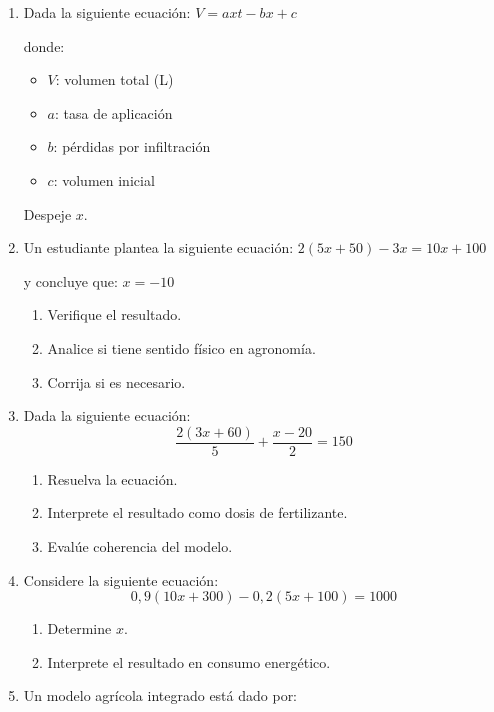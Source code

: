 \documentclass[11pt]{article}
\begin{document}
\begin{enumerate}
		\item Dada la siguiente ecuación:	$V = axt - bx + c$
		
		donde:
		\begin{itemize}
			\item $V$: volumen total (L)
			\item $a$: tasa de aplicación
			\item $b$: pérdidas por infiltración
			\item $c$: volumen inicial
		\end{itemize}
		
		
		Despeje $x$.
		
		
		\newpage
		\vspace*{0.2em}
		
		\item Un estudiante plantea la siguiente ecuación: $
		2(5x + 50) - 3x = 10x + 100$
		
		
		y concluye que: $x = -10$
				
		\begin{enumerate}
			\item Verifique el resultado.
			\item Analice si tiene sentido físico en agronomía.
			\item Corrija si es necesario.
		\end{enumerate}
		
		\item Dada la siguiente ecuación:
		\[
		\frac{2(3x + 60)}{5} + \frac{x - 20}{2} = 150
		\]
		
		\begin{enumerate}
			\item Resuelva la ecuación.
			\item Interprete el resultado como dosis de fertilizante.
			\item Evalúe coherencia del modelo.
		\end{enumerate}
		
		\item Considere la siguiente ecuación:
			\[
		0{,}9(10x + 300) - 0{,}2(5x + 100) = 1000
		\]
		
		\begin{enumerate}
			\item Determine $x$.
			\item Interprete el resultado en consumo energético.
		\end{enumerate}
	
	\item Un modelo agrícola integrado está dado por:
	

\end{enumerate}
\end{document}
